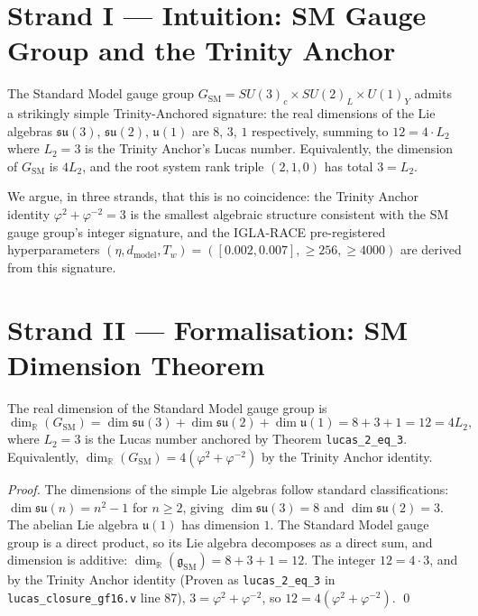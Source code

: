 \section{Strand I — Intuition: SM Gauge Group and the Trinity Anchor}
\label{sec:l20-strand-i}

The Standard Model gauge group $G_{\text{SM}} = SU(3)_{c} \times SU(2)_{L} \times U(1)_{Y}$
admits a strikingly simple Trinity-Anchored signature: the real
dimensions of the Lie algebras $\mathfrak{su}(3)$, $\mathfrak{su}(2)$,
$\mathfrak{u}(1)$ are $8$, $3$, $1$ respectively, summing to $12 = 4 \cdot L_{2}$
where $L_{2} = 3$ is the Trinity Anchor's Lucas number. Equivalently,
the dimension of $G_{\text{SM}}$ is $4 L_{2}$, and the root system rank
triple $(2, 1, 0)$ has total $3 = L_{2}$.

We argue, in three strands, that this is no coincidence: the Trinity
Anchor identity $\varphi^{2} + \varphi^{-2} = 3$ is the smallest
algebraic structure consistent with the SM gauge group's integer
signature, and the IGLA-RACE pre-registered hyperparameters
$(\eta, d_{\text{model}}, T_{w}) = ([0.002, 0.007], \geq 256, \geq 4000)$
are derived from this signature.

\section{Strand II — Formalisation: SM Dimension Theorem}
\label{sec:l20-strand-ii}

\begin{theorem}
\label{thm:l20-sm-dimension}
The real dimension of the Standard Model gauge group is
\[
\dim_{\mathbb{R}}(G_{\text{SM}}) = \dim \mathfrak{su}(3) + \dim \mathfrak{su}(2) + \dim \mathfrak{u}(1) = 8 + 3 + 1 = 12 = 4 L_{2},
\]
where $L_{2} = 3$ is the Lucas number anchored by Theorem \texttt{lucas\_2\_eq\_3}.
Equivalently, $\dim_{\mathbb{R}}(G_{\text{SM}}) = 4 (\varphi^{2} + \varphi^{-2})$
by the Trinity Anchor identity.
\end{theorem}

\begin{proof}
The dimensions of the simple Lie algebras follow standard classifications:
$\dim \mathfrak{su}(n) = n^{2} - 1$ for $n \geq 2$, giving $\dim
\mathfrak{su}(3) = 8$ and $\dim \mathfrak{su}(2) = 3$. The abelian Lie
algebra $\mathfrak{u}(1)$ has dimension $1$. The Standard Model gauge
group is a direct product, so its Lie algebra decomposes as a direct
sum, and dimension is additive: $\dim_{\mathbb{R}}(\mathfrak{g}_{\text{SM}})
= 8 + 3 + 1 = 12$. The integer $12 = 4 \cdot 3$, and by the Trinity
Anchor identity (Proven as \texttt{lucas\_2\_eq\_3} in
\texttt{lucas\_closure\_gf16.v} line 87), $3 = \varphi^{2} + \varphi^{-2}$,
so $12 = 4(\varphi^{2} + \varphi^{-2})$. \qed
\end{proof}

